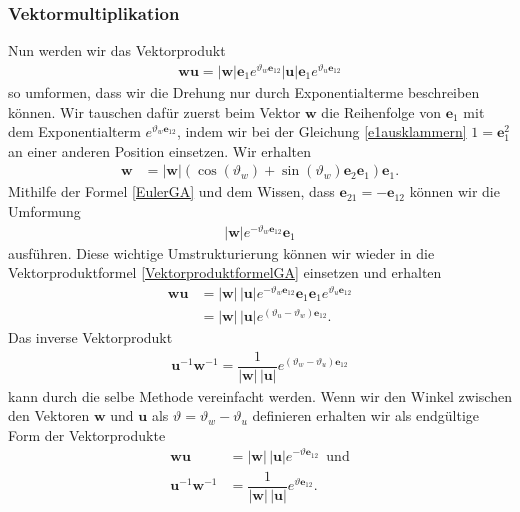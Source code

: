 \subsubsection{Vektormultiplikation}
Nun werden wir das Vektorprodukt
\begin{align} \label{VektorproduktformelGA}
\mathbf{wu} = |\mathbf{w}|\mathbf{e}_1 e^{\vartheta_w \mathbf{e}_{12}}|\mathbf{u}|\mathbf{e}_1 e^{\vartheta_u \mathbf{e}_{12}}
\end{align}
so umformen, dass wir die Drehung nur durch Exponentialterme beschreiben können. Wir tauschen dafür zuerst beim Vektor $\mathbf{w}$ die Reihenfolge von 
$\mathbf{e}_1$ mit dem Exponentialterm $e^{\vartheta_w \mathbf{e}_{12}}$, indem wir bei der Gleichung \eqref{e1ausklammern} $1=\mathbf{e}_1^2$ an einer anderen Position einsetzen.
Wir erhalten
\begin{align*} 
\mathbf{w} &= |\mathbf{w}|\left(\cos(\vartheta_w)+ \sin(\vartheta_w) \mathbf{e}_2\mathbf{e}_1\right)\mathbf{e}_1.
\end{align*}
Mithilfe der Formel \eqref{EulerGA} und dem Wissen, dass $\mathbf{e}_{21}= -\mathbf{e}_{12}$ können wir die Umformung
\begin{align*}
|\mathbf{w}|e^{-\vartheta_w \mathbf{e}_{12}}\mathbf{e}_1
\end{align*}
ausführen. Diese wichtige Umstrukturierung können wir wieder in die Vektorproduktformel \eqref{VektorproduktformelGA} einsetzen und erhalten
\begin{align*}
\mathbf{wu} &= |\mathbf{w}|\,|\mathbf{u}|e^{-\vartheta_w \mathbf{e}_{12}}\mathbf{e}_1\mathbf{e}_1 e^{\vartheta_u \mathbf{e}_{12}}\\
&= |\mathbf{w}|\,|\mathbf{u}|e^{(\vartheta_u-\vartheta_w) \mathbf{e}_{12}}.
\end{align*}
Das inverse Vektorprodukt
\begin{align*}
\mathbf{u}^{-1}\mathbf{w}^{-1} = \dfrac{1}{|\mathbf{w}|\,|\mathbf{u}|}e^{(\vartheta_w-\vartheta_u) \mathbf{e}_{12}}
\end{align*}
kann durch die selbe Methode vereinfacht werden.
Wenn wir den Winkel zwischen den Vektoren  $\mathbf{w}$ und $\mathbf{u}$ als $\vartheta = \vartheta_w - \vartheta_u$ definieren erhalten wir als endgültige Form der Vektorprodukte
\begin{align}\label{wuExpo}
\mathbf{wu} &= |\mathbf{w}|\,|\mathbf{u}|e^{-\vartheta \mathbf{e}_{12}}\enspace\text{und}\\
\mathbf{u}^{-1}\mathbf{w}^{-1} &= \dfrac{1}{|\mathbf{w}|\,|\mathbf{u}|}e^{\vartheta \mathbf{e}_{12}} \label{wuExpoInv}.
\end{align}
